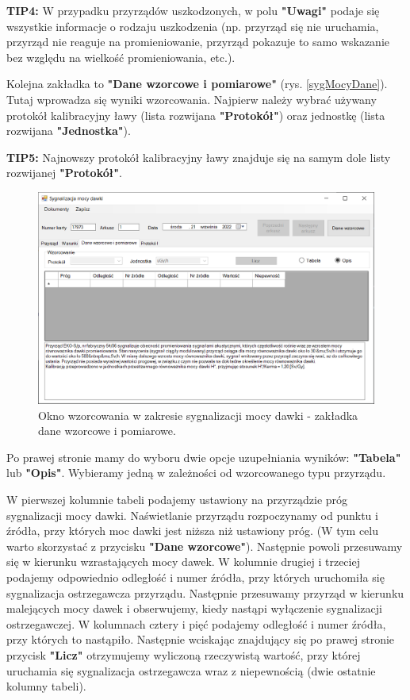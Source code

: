 	\textbf{TIP4:} W przypadku przyrządów uszkodzonych, w polu \textbf{"Uwagi"} podaje się wszystkie informacje o rodzaju uszkodzenia (np. przyrząd się nie uruchamia, przyrząd nie reaguje na promieniowanie, przyrząd pokazuje to samo wskazanie bez względu na wielkość promieniowania, etc.).

	Kolejna zakładka to \textbf{"Dane wzorcowe i pomiarowe"} (rys. \ref{sygMocyDane}). Tutaj wprowadza się wyniki wzorcowania. Najpierw należy wybrać używany protokół kalibracyjny ławy (lista rozwijana \textbf{"Protokół"}) oraz jednostkę (lista rozwijana \textbf{"Jednostka"}).
	
	\textbf{TIP5:} Najnowszy protokół kalibracyjny ławy znajduje się na samym dole listy rozwijanej \textbf{"Protokół"}.
	
	\begin{figure}[htb]
	\centering
	\includegraphics[width=\columnwidth]{obrazki/Wzorcowanie/syg_mocy_dawki/dane2.png}
	\caption{Okno wzorcowania w zakresie sygnalizacji mocy dawki - zakładka dane wzorcowe i pomiarowe.}
	\label{sygMocyDane2}
\end{figure}

	Po prawej stronie mamy do wyboru dwie opcje uzupełniania wyników: \textbf{"Tabela"} lub \textbf{"Opis"}. Wybieramy jedną w zależności od wzorcowanego typu przyrządu. 
		
	W pierwszej kolumnie tabeli podajemy ustawiony na przyrządzie próg sygnalizacji mocy dawki. Naświetlanie przyrządu rozpoczynamy od punktu i źródła, przy których moc dawki jest niższa niż ustawiony próg. (W tym celu warto skorzystać z przycisku \textbf{"Dane wzorcowe"}). Następnie powoli przesuwamy się w kierunku wzrastających mocy dawek. W kolumnie drugiej i trzeciej podajemy odpowiednio odległość i numer źródła, przy których uruchomiła się sygnalizacja ostrzegawcza przyrządu. Następnie przesuwamy przyrząd w kierunku malejących mocy dawek i obserwujemy, kiedy nastąpi wyłączenie sygnalizacji ostrzegawczej. W kolumnach cztery i pięć podajemy odległość i numer źródła, przy których to nastąpiło. Następnie wciskając znajdujący się po prawej stronie przycisk \textbf{"Licz"} otrzymujemy wyliczoną rzeczywistą wartość, przy której uruchamia się sygnalizacja ostrzegawcza wraz z niepewnością (dwie ostatnie kolumny tabeli).

